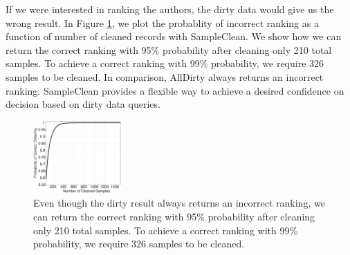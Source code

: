 If we were interested in ranking the authors, the dirty data would give us the wrong result. 
In Figure \ref{exp:ms-academic-ranking}, we plot the probablity of incorrect ranking as a function of number of cleaned records with SampleClean.
We show how we can return the correct ranking with 95\% probability after cleaning only 210 total samples.
To achieve a correct ranking with 99\% probability, we require 326 samples to be cleaned.
In comparison, AllDirty always returns an incorrect ranking.
SampleClean provides a flexible way to achieve a desired confidence on decision based on dirty data queries.

\begin{figure}
\includegraphics[width=0.3\textwidth]{figs/msacademic-paper-ranking.eps}
\caption{Even though the dirty result always returns an incorrect ranking, we can return the correct ranking with 95\% probability after cleaning only 210 total samples. To achieve a correct ranking with 99\% probability, we require 326 samples to be cleaned.\label{exp:ms-academic-ranking}}

\end{figure}


